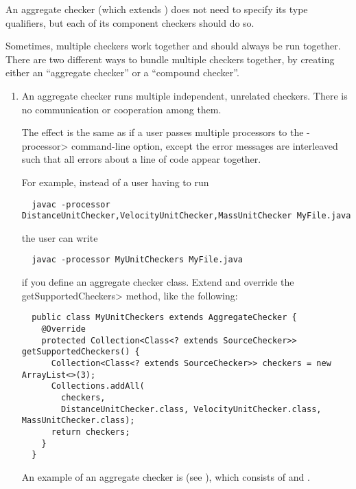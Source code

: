 An aggregate checker (which extends
) does not need to specify its
type qualifiers, but each of its component checkers should do so.



Sometimes, multiple checkers work together and should always be run
together.  There are two different ways to bundle multiple checkers
together, by creating either an ``aggregate checker'' or a ``compound checker''.


\begin{enumerate}
\item
An aggregate checker runs multiple independent, unrelated checkers.  There
is no communication or cooperation among them.

The effect is the same as if a user passes
multiple processors to the \<-processor> command-line option,
except the error messages are interleaved
such that all errors about a line of code appear together.

For example, instead of a user having to run

\begin{Verbatim}
  javac -processor DistanceUnitChecker,VelocityUnitChecker,MassUnitChecker MyFile.java
\end{Verbatim}

\noindent
the user can write

\begin{Verbatim}
  javac -processor MyUnitCheckers MyFile.java
\end{Verbatim}

\noindent
if you define an aggregate checker class.  Extend  and override
the \<getSupportedCheckers> method, like the following:

\begin{Verbatim}
  public class MyUnitCheckers extends AggregateChecker {
    @Override
    protected Collection<Class<? extends SourceChecker>> getSupportedCheckers() {
      Collection<Class<? extends SourceChecker>> checkers = new ArrayList<>(3);
      Collections.addAll(
        checkers,
        DistanceUnitChecker.class, VelocityUnitChecker.class, MassUnitChecker.class);
      return checkers;
    }
  }
\end{Verbatim}

An example of an aggregate checker is 
(see ), which consists of
 and
.


\end{enumerate}
